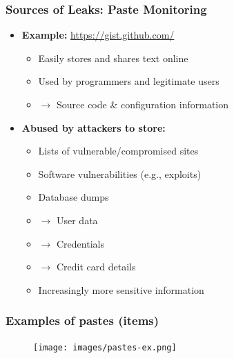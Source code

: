 \documentclass[aspectratio=169]{beamer}
\begin{document}
\begin{frame}
    \frametitle{Sources of Leaks: Paste Monitoring}
    \begin{itemize}
        \item \textbf{Example:} \url{https://gist.github.com/}
        \begin{itemize}
            \item Easily stores and shares text online
            \item Used by programmers and legitimate users
            \item[] $\rightarrow$ Source code \& configuration information
        \end{itemize}
        \vspace{0.3cm}
        \item \textbf{Abused by attackers to store:}
        \begin{itemize}
            \item Lists of vulnerable/compromised sites
            \item Software vulnerabilities (e.g., exploits)
            \item Database dumps
            \item[] $\rightarrow$ User data
            \item[] $\rightarrow$ Credentials
            \item[] $\rightarrow$ Credit card details
            \item Increasingly more sensitive information
        \end{itemize}
    \end{itemize}
\end{frame}

\begin{frame}[t,plain]
        \frametitle{Examples of pastes (items)}
    \begin{figure}
        \texttt{[image: images/pastes-ex.png]}
    \end{figure}
\end{frame}
\end{document}
